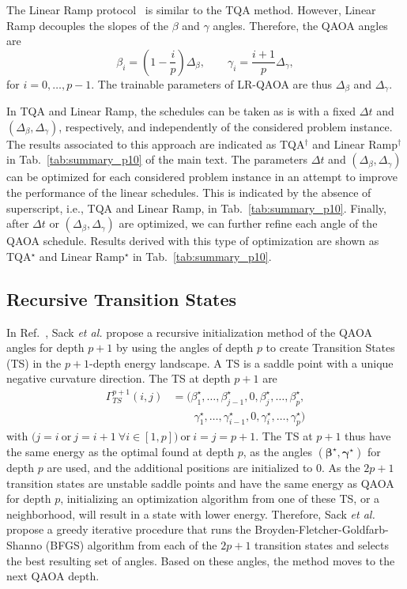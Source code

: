 \documentclass[twocolumn,
english,
aps,
pra,
10pt,
longbibliography,
superscriptaddress,
amsmath,
amssymb,
floatfix
]{revtex4-2}
\begin{document}
{The Linear Ramp protocol~\cite{Montanezbarrera2024} is similar to the TQA method. 
However, Linear Ramp decouples the slopes of the $\beta$ and $\gamma$ angles.
Therefore, the QAOA angles are
\begin{equation}
\beta_i = \left(1-\frac{i}{p}\right)\Delta_\beta,
\qquad
\gamma_i = \frac{i+1}{p}\Delta_\gamma,
\end{equation}
for $i = 0, \ldots, p-1$. 
The trainable parameters of LR-QAOA are thus $\Delta_\beta$ and $\Delta_\gamma$.

In TQA and Linear Ramp, the schedules can be taken as is with a fixed $\Delta t$ and $(\Delta_\beta, \Delta_\gamma)$, respectively, and independently of the considered problem instance.
The results associated to this approach are indicated as TQA$^\dagger$ and Linear Ramp$^\dagger$ in Tab.~\ref{tab:summary_p10} of the main text.
The parameters $\Delta t$ and $(\Delta_\beta, \Delta_\gamma)$ can be optimized for each considered problem instance in an attempt to improve the performance of the linear schedules.
This is indicated by the absence of superscript, i.e., TQA and Linear Ramp, in Tab.~\ref{tab:summary_p10}.
Finally, after $\Delta t$ or $(\Delta_\beta, \Delta_\gamma)$ are optimized, we can further refine each angle of the QAOA schedule.
Results derived with this type of optimization are shown as TQA$^\star$ and Linear Ramp$^\star$ in Tab.~\ref{tab:summary_p10}.


\subsection{Recursive Transition States}

In Ref.~\cite{Sack2023}, Sack \emph{et al.} propose a recursive initialization method of the QAOA angles for depth $p+1$ by using the angles of depth $p$ to create Transition States (TS) in the $p+1$-depth energy landscape.
A TS is a saddle point with a unique negative curvature direction.
The TS at depth $p+1$ are
\begin{equation}
\label{eq:ts}
\begin{split}
\Gamma_{TS}^{p+1}(i,j)
&=
(\beta_1^\star,\ldots,\beta_{j-1}^\star,0,\beta_j^\star,\ldots,\beta_p^\star, \\
&\qquad
\gamma_1^\star,\ldots,\gamma_{i-1}^\star,0,\gamma_i^\star,\ldots,\gamma_p^\star)
\end{split}
\end{equation}
with $(j=i \ \text{or}\ j=i+1 \ \forall i\in[1,p]\bigr)
\ \text{or}\ i=j=p+1$.
The TS at $p+1$ thus have the same energy as the optimal found at depth $p$, as the angles $(\boldsymbol{\beta}^\star, \boldsymbol{\gamma}^\star)$ for depth $p$ are used, and the additional positions are initialized to 0.
As the $2p+1$ transition states are unstable saddle points and have the same energy as QAOA for depth $p$, initializing an optimization algorithm from one of these TS, or a neighborhood, will result in a state with lower energy. 
Therefore, Sack \emph{et al.} propose a greedy iterative procedure that runs the Broyden-Fletcher-Goldfarb-Shanno (BFGS) algorithm from each of the $2p+1$ transition states and selects the best resulting set of angles.
Based on these angles, the method moves to the next QAOA depth.

}
\end{document}
